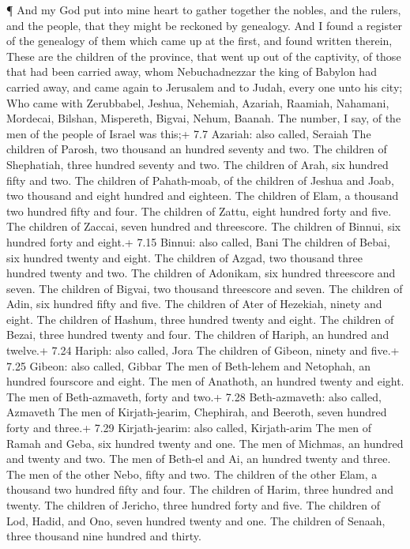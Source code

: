  ¶ And my God put into mine heart to gather together the
nobles, and the rulers, and the people, that they might be reckoned by
genealogy. And I found a register of the genealogy of them which came up
at the first, and found written therein,  These are the
children of the province, that went up out of the captivity, of those
that had been carried away, whom Nebuchadnezzar the king of Babylon had
carried away, and came again to Jerusalem and to Judah, every one unto
his city;  Who came with Zerubbabel, Jeshua, Nehemiah,
Azariah, Raamiah, Nahamani, Mordecai, Bilshan, Mispereth, Bigvai, Nehum,
Baanah. The number, I say, of the men of the people of Israel was this;+
7.7 Azariah: also called, Seraiah  The children of Parosh,
two thousand an hundred seventy and two.  The children of
Shephatiah, three hundred seventy and two.  The children of
Arah, six hundred fifty and two.  The children of
Pahath-moab, of the children of Jeshua and Joab, two thousand and eight
hundred and eighteen.  The children of Elam, a thousand two
hundred fifty and four.  The children of Zattu, eight
hundred forty and five.  The children of Zaccai, seven
hundred and threescore.  The children of Binnui, six
hundred forty and eight.+ 7.15 Binnui: also called, Bani 
The children of Bebai, six hundred twenty and eight.  The
children of Azgad, two thousand three hundred twenty and two.
 The children of Adonikam, six hundred threescore and
seven.  The children of Bigvai, two thousand threescore and
seven.  The children of Adin, six hundred fifty and five.
 The children of Ater of Hezekiah, ninety and eight.
 The children of Hashum, three hundred twenty and eight.
 The children of Bezai, three hundred twenty and four.
 The children of Hariph, an hundred and twelve.+ 7.24
Hariph: also called, Jora  The children of Gibeon, ninety
and five.+ 7.25 Gibeon: also called, Gibbar  The men of
Beth-lehem and Netophah, an hundred fourscore and eight. 
The men of Anathoth, an hundred twenty and eight.  The men
of Beth-azmaveth, forty and two.+ 7.28 Beth-azmaveth: also called,
Azmaveth  The men of Kirjath-jearim, Chephirah, and
Beeroth, seven hundred forty and three.+ 7.29 Kirjath-jearim: also
called, Kirjath-arim  The men of Ramah and Geba, six
hundred twenty and one.  The men of Michmas, an hundred and
twenty and two.  The men of Beth-el and Ai, an hundred
twenty and three.  The men of the other Nebo, fifty and
two.  The children of the other Elam, a thousand two
hundred fifty and four.  The children of Harim, three
hundred and twenty.  The children of Jericho, three hundred
forty and five.  The children of Lod, Hadid, and Ono, seven
hundred twenty and one.  The children of Senaah, three
thousand nine hundred and thirty.

